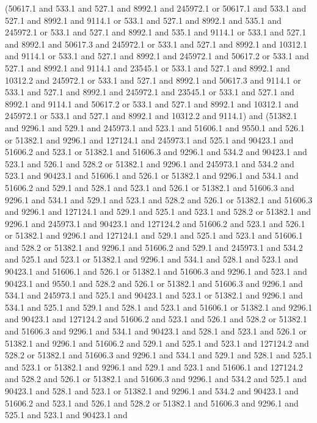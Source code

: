 (50617.1 and 533.1 and 527.1 and 8992.1 and 245972.1 or 50617.1 and
533.1 and 527.1 and 8992.1 and 9114.1 or 533.1 and 527.1 and 8992.1
and 535.1 and 245972.1 or 533.1 and 527.1 and 8992.1 and 535.1 and
9114.1 or 533.1 and 527.1 and 8992.1 and 50617.3 and 245972.1 or 533.1
and 527.1 and 8992.1 and 10312.1 and 9114.1 or 533.1 and 527.1 and
8992.1 and 245972.1 and 50617.2 or 533.1 and 527.1 and 8992.1 and
9114.1 and 23545.1 or 533.1 and 527.1 and 8992.1 and 10312.2 and
245972.1 or 533.1 and 527.1 and 8992.1 and 50617.3 and 9114.1 or 533.1
and 527.1 and 8992.1 and 245972.1 and 23545.1 or 533.1 and 527.1 and
8992.1 and 9114.1 and 50617.2 or 533.1 and 527.1 and 8992.1 and
10312.1 and 245972.1 or 533.1 and 527.1 and 8992.1 and 10312.2 and
9114.1) and (51382.1 and 9296.1 and 529.1 and 245973.1 and 523.1 and
51606.1 and 9550.1 and 526.1 or 51382.1 and 9296.1 and 127124.1 and
245973.1 and 525.1 and 90423.1 and 51606.2 and 523.1 or 51382.1 and
51606.3 and 9296.1 and 534.2 and 90423.1 and 523.1 and 526.1 and 528.2
or 51382.1 and 9296.1 and 245973.1 and 534.2 and 523.1 and 90423.1 and
51606.1 and 526.1 or 51382.1 and 9296.1 and 534.1 and 51606.2 and
529.1 and 528.1 and 523.1 and 526.1 or 51382.1 and 51606.3 and 9296.1
and 534.1 and 529.1 and 523.1 and 528.2 and 526.1 or 51382.1 and
51606.3 and 9296.1 and 127124.1 and 529.1 and 525.1 and 523.1 and
528.2 or 51382.1 and 9296.1 and 245973.1 and 90423.1 and 127124.2 and
51606.2 and 523.1 and 526.1 or 51382.1 and 9296.1 and 127124.1 and
529.1 and 525.1 and 523.1 and 51606.1 and 528.2 or 51382.1 and 9296.1
and 51606.2 and 529.1 and 245973.1 and 534.2 and 525.1 and 523.1 or
51382.1 and 9296.1 and 534.1 and 528.1 and 523.1 and 90423.1 and
51606.1 and 526.1 or 51382.1 and 51606.3 and 9296.1 and 523.1 and
90423.1 and 9550.1 and 528.2 and 526.1 or 51382.1 and 51606.3 and
9296.1 and 534.1 and 245973.1 and 525.1 and 90423.1 and 523.1 or
51382.1 and 9296.1 and 534.1 and 525.1 and 529.1 and 528.1 and 523.1
and 51606.1 or 51382.1 and 9296.1 and 90423.1 and 127124.2 and 51606.2
and 523.1 and 526.1 and 528.2 or 51382.1 and 51606.3 and 9296.1 and
534.1 and 90423.1 and 528.1 and 523.1 and 526.1 or 51382.1 and 9296.1
and 51606.2 and 529.1 and 525.1 and 523.1 and 127124.2 and 528.2 or
51382.1 and 51606.3 and 9296.1 and 534.1 and 529.1 and 528.1 and 525.1
and 523.1 or 51382.1 and 9296.1 and 529.1 and 523.1 and 51606.1 and
127124.2 and 528.2 and 526.1 or 51382.1 and 51606.3 and 9296.1 and
534.2 and 525.1 and 90423.1 and 528.1 and 523.1 or 51382.1 and 9296.1
and 534.2 and 90423.1 and 51606.2 and 523.1 and 526.1 and 528.2 or
51382.1 and 51606.3 and 9296.1 and 525.1 and 523.1 and 90423.1 and
